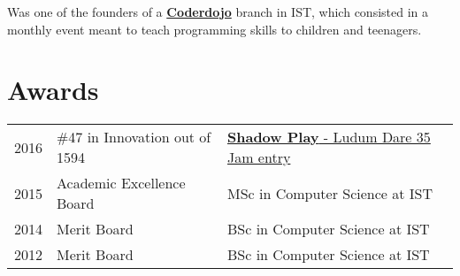 \documentclass[a4paper]{deedy-resume} %
\begin{document}
\begin{minipage}[t]{0.64\textwidth}
Was one of the founders of a \textbf{\href{https://coderdojo.com/}{Coderdojo}} branch in IST, which consisted in a monthly event meant to teach programming skills to children and teenagers.

\sectionspace %



\section{Awards} 
\begin{tabular}{rll}
	2016	     & \#47 in Innovation out of 1594 & \href{http://ludumdare.com/compo/ludum-dare-35/?uid=90138}{\textbf{Shadow Play} - Ludum Dare 35 Jam entry}\\
    2015	     & Academic Excellence Board  & MSc in Computer Science at IST\\
	2014	     & Merit Board  & BSc in Computer Science at IST\\
	2012	     & Merit Board  & BSc in Computer Science at IST\\
\end{tabular}


\end{minipage} %








\end{document}
